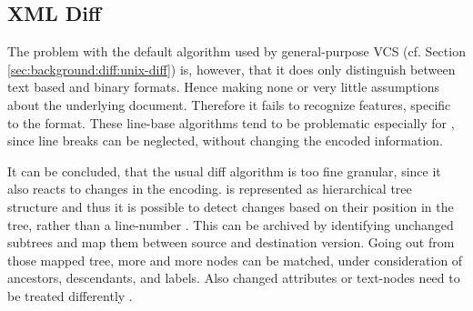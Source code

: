 	\subsection{XML Diff}
	\label{sec:background:diff:xml-diff}
	The problem with the default algorithm used by general-purpose VCS (cf. Section \ref{sec:background:diff:unix-diff}) is, however, that it does only distinguish between text based and binary formats. Hence making none or very little assumptions about the underlying document. Therefore it fails to recognize features, specific to the format. These line-base algorithms tend to be problematic especially for \xml, since line breaks can be neglected, without changing the encoded information. \citep{Ronnau2005}
	
	It can be concluded, that the usual diff algorithm is too fine granular, since it also reacts to changes in the encoding. \xml is represented as hierarchical tree structure and thus it is possible to detect changes based on their position in the tree, rather than a line-number \citep{Wang2003,Chawathe1996,Cobena2002}.
	This can be archived by identifying unchanged subtrees and map them between source and destination version. Going out from those mapped tree, more and more nodes can be matched, under consideration of ancestors, descendants, and labels. Also changed attributes or text-nodes need to be treated differently \citep{Cobena2002}.
	
	
